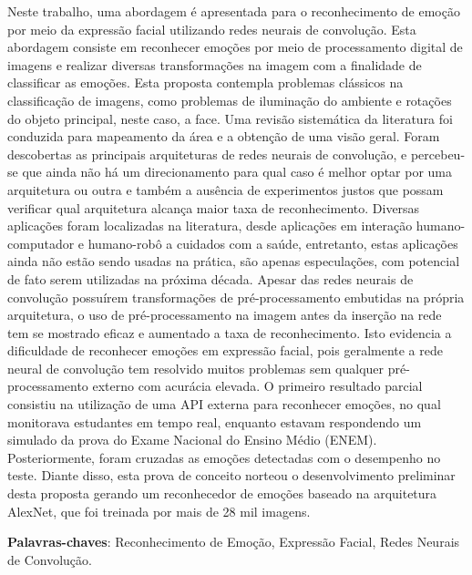 \documentclass[oldfontcommands,12pt,openright,twoside,a4paper,brazil]{abntex2}
\begin{document}

\begin{resumo}
Neste trabalho, uma abordagem é apresentada para o reconhecimento de emoção por meio da expressão facial utilizando redes neurais de convolução. Esta abordagem consiste em reconhecer emoções por meio de processamento digital de imagens e realizar diversas transformações na imagem com a finalidade de classificar as emoções. Esta proposta contempla problemas clássicos na classificação de imagens, como problemas de iluminação do ambiente e rotações do objeto principal, neste caso, a face. Uma revisão sistemática da literatura foi conduzida para mapeamento da área e a obtenção de uma visão geral. Foram descobertas as principais arquiteturas de redes neurais de convolução, e percebeu-se que ainda não há um direcionamento para qual caso é melhor optar por uma arquitetura ou outra e também a ausência de experimentos justos que possam verificar qual arquitetura alcança maior taxa de reconhecimento. Diversas aplicações foram localizadas na literatura, desde aplicações em interação humano-computador e humano-robô a cuidados com a saúde, entretanto, estas aplicações ainda não estão sendo usadas na prática, são apenas especulações, com potencial de fato serem utilizadas na próxima década. Apesar das redes neurais de convolução possuírem transformações de pré-processamento embutidas na própria arquitetura, o uso de pré-processamento na imagem antes da inserção na rede tem se mostrado eficaz e aumentado a taxa de reconhecimento. Isto evidencia a dificuldade de reconhecer emoções em expressão facial, pois geralmente a rede neural de convolução tem resolvido muitos problemas sem qualquer pré-processamento externo com acurácia elevada. O primeiro resultado parcial consistiu na utilização de uma API externa para reconhecer emoções, no qual monitorava estudantes em tempo real, enquanto estavam respondendo um simulado da prova do Exame Nacional do Ensino Médio (ENEM). Posteriormente, foram cruzadas as emoções detectadas com o desempenho no teste. Diante disso, esta prova de conceito norteou o desenvolvimento preliminar desta proposta gerando um reconhecedor de emoções baseado na arquitetura AlexNet, que foi treinada por mais de 28 mil imagens.  





   \vspace{\onelineskip}
 
   \noindent 
   \textbf{Palavras-chaves}: Reconhecimento de Emoção, Expressão Facial, Redes Neurais de Convolução.
\end{resumo}
\end{document}

